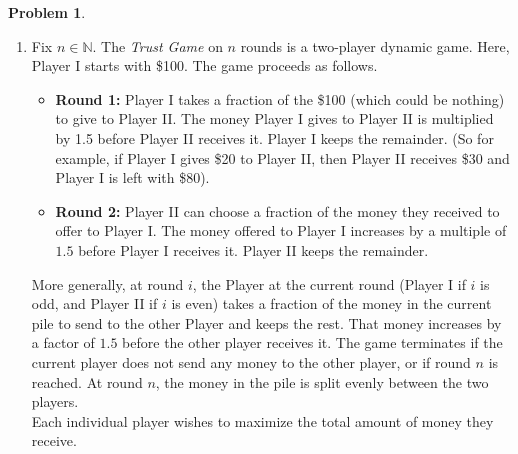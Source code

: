\documentclass[11pt]{article}
\theoremstyle{definition}
\theoremstyle{definition}
\newtheorem{required}{Problem}
\theoremstyle{definition}
\begin{document}
\begin{required}
\begin{enumerate}
\begin{proof}[Answer]
From the above we can see that our precise subproblem for this problem would be how many ways it will take us to reach $s_n$ from $s_{k+i}$ for all $i \in \{ 1, 2, \ldots, a_{k}\}$ \\

Our base case for this problem would be $s_n$ where we know that there only exists one way to get to $s_n$ from $s_n$\\

Our recursive structure for $T(k)$ would be to find $T(k+i)$ for all $i \in \{ 1, 2, \ldots, a_{k}\}$.
\end{proof}

\newpage
\subsection*{Problem 21(b)}

\item Fix $n \in \mathbb{N}$. The \textit{Trust Game} on $n$ rounds is a two-player dynamic game. Here, Player I starts with \$100. The game proceeds as follows.
\begin{itemize}
\item \textbf{Round 1:} Player I takes a fraction of the \$100 (which could be nothing) to give to Player II. The money Player I gives to Player II is multiplied by 1.5 before Player II receives it. Player I keeps the remainder. (So for example, if Player I gives \$20 to Player II, then Player II receives \$30 and Player I is left with \$80).

\item \textbf{Round 2:} Player II can choose a fraction of the money they received to offer to Player I. The money offered to Player I increases by a multiple of $1.5$  before Player I receives it. Player II keeps the remainder.
\end{itemize}

\noindent More generally, at round $i$, the Player at the current round (Player I if $i$ is odd, and Player II if $i$ is even) takes a fraction of the money in the current pile to send to the other Player and keeps the rest. That money increases by a factor of $1.5$ before the other player receives it. The game terminates if the current player does not send any money to the other player, or if round $n$ is reached. At round $n$, the money in the pile is split evenly between the two players. \\

\noindent Each individual player wishes to maximize the total amount of money they receive. \\


\end{enumerate}
\end{required}
\end{document}

